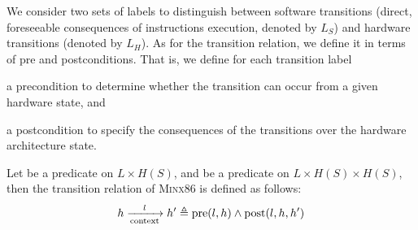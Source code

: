 We consider two sets of labels to distinguish between software transitions
(direct, foreseeable consequences of instructions execution, denoted by $L_S$)
and hardware transitions (denoted by $L_H$).
%
As for the transition relation, we define it in terms of pre and postconditions.
%
That is, we define for each transition label
%
\begin{inparaenum}[(1)]
\item a precondition to determine whether the transition can occur from a given
  hardware state, and
\item a postcondition to specify the consequences of the transitions over the
  hardware architecture state.
\end{inparaenum}
%
Let  be a predicate on \( L \times H(S) \), and  be a
predicate on \( L \times H(S) \times H(S) \), then the transition relation of
{\scshape Minx86} is defined as follows:
%
\[
  h \xrightarrow[\mathrm{context}]{l} h' \triangleq \mathrm{pre}(l, h) \wedge
  \mathrm{post}(l, h, h')
\]

